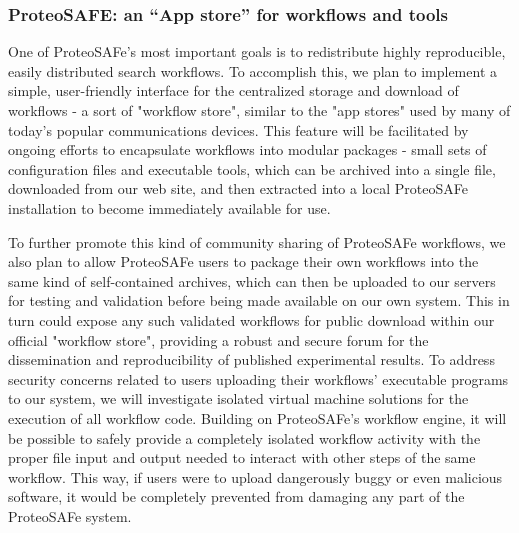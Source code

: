 \documentclass[arial,11pt]{article}
\begin{document}

\subsubsection{ProteoSAFE: an ``App store'' for workflows and tools}
One of ProteoSAFe's most important goals is to redistribute highly reproducible, easily distributed search workflows.  To accomplish this, we plan to implement a simple, user-friendly interface for the centralized storage and download of workflows - a sort of "workflow store", similar to the "app stores" used by many of today's popular communications devices.  This feature will be facilitated by ongoing efforts to encapsulate workflows into modular packages - small sets of configuration files and executable tools, which can be archived into a single file, downloaded from our web site, and then extracted into a local ProteoSAFe installation to become immediately available for use.

To further promote this kind of community sharing of ProteoSAFe workflows, we also plan to allow ProteoSAFe users to package their own workflows into the same kind of self-contained archives, which can then be uploaded to our servers for testing and validation before being made available on our own system. This in turn could expose any such validated workflows for public download within our official "workflow store", providing a robust and secure forum for the dissemination and reproducibility of published experimental results.
%
To address security concerns related to users uploading their workflows' executable programs to our system, we will investigate isolated virtual machine solutions for the execution of all workflow code.  Building on ProteoSAFe's workflow engine, it will be possible to safely provide a completely isolated workflow activity with the proper file input and output needed to interact with other steps of the same workflow.  This way, if users were to upload dangerously buggy or even malicious software, it would be completely prevented from damaging any part of the ProteoSAFe system.
\end{document}
